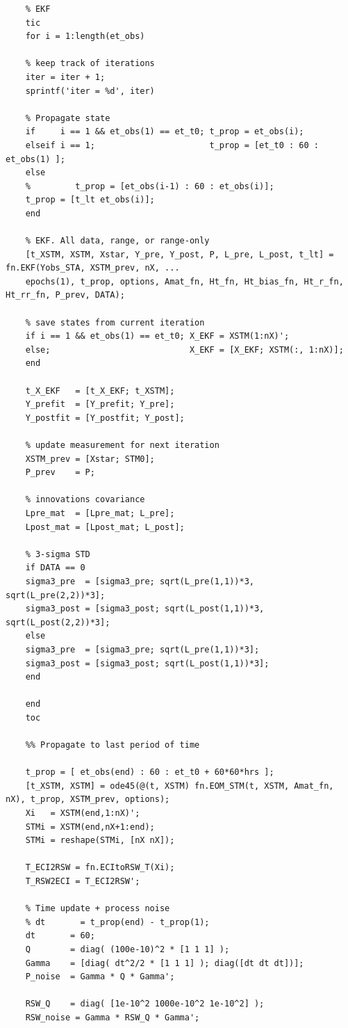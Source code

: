 \documentclass[conf]{new-aiaa}
\begin{document}
\begin{lstlisting}
	% EKF 
	tic
	for i = 1:length(et_obs) 
	
	% keep track of iterations 
	iter = iter + 1; 
	sprintf('iter = %d', iter)
	
	% Propagate state 
	if     i == 1 && et_obs(1) == et_t0; t_prop = et_obs(i); 
	elseif i == 1;                       t_prop = [et_t0 : 60 : et_obs(1) ]; 
	else                                
	%         t_prop = [et_obs(i-1) : 60 : et_obs(i)]; 
	t_prop = [t_lt et_obs(i)]; 
	end
	
	% EKF. All data, range, or range-only 
	[t_XSTM, XSTM, Xstar, Y_pre, Y_post, P, L_pre, L_post, t_lt] = fn.EKF(Yobs_STA, XSTM_prev, nX, ... 
	epochs(1), t_prop, options, Amat_fn, Ht_fn, Ht_bias_fn, Ht_r_fn, Ht_rr_fn, P_prev, DATA); 
	
	% save states from current iteration 
	if i == 1 && et_obs(1) == et_t0; X_EKF = XSTM(1:nX)'; 
	else;                            X_EKF = [X_EKF; XSTM(:, 1:nX)]; 
	end 
	
	t_X_EKF   = [t_X_EKF; t_XSTM]; 
	Y_prefit  = [Y_prefit; Y_pre]; 
	Y_postfit = [Y_postfit; Y_post]; 
	
	% update measurement for next iteration 
	XSTM_prev = [Xstar; STM0]; 
	P_prev    = P;
	
	% innovations covariance 
	Lpre_mat  = [Lpre_mat; L_pre]; 
	Lpost_mat = [Lpost_mat; L_post]; 
	
	% 3-sigma STD 
	if DATA == 0
	sigma3_pre  = [sigma3_pre; sqrt(L_pre(1,1))*3, sqrt(L_pre(2,2))*3];  
	sigma3_post = [sigma3_post; sqrt(L_post(1,1))*3, sqrt(L_post(2,2))*3];  
	else  
	sigma3_pre  = [sigma3_pre; sqrt(L_pre(1,1))*3];  
	sigma3_post = [sigma3_post; sqrt(L_post(1,1))*3];  
	end
	
	end 
	toc
	
	%% Propagate to last period of time 
	
	t_prop = [ et_obs(end) : 60 : et_t0 + 60*60*hrs ]; 
	[t_XSTM, XSTM] = ode45(@(t, XSTM) fn.EOM_STM(t, XSTM, Amat_fn, nX), t_prop, XSTM_prev, options); 
	Xi   = XSTM(end,1:nX)'; 
	STMi = XSTM(end,nX+1:end); 
	STMi = reshape(STMi, [nX nX]); 
	
	T_ECI2RSW = fn.ECItoRSW_T(Xi); 
	T_RSW2ECI = T_ECI2RSW';
	
	% Time update + process noise 
	% dt       = t_prop(end) - t_prop(1); 
	dt       = 60; 
	Q        = diag( (100e-10)^2 * [1 1 1] ); 
	Gamma    = [diag( dt^2/2 * [1 1 1] ); diag([dt dt dt])]; 
	P_noise  = Gamma * Q * Gamma'; 
	
	RSW_Q    = diag( [1e-10^2 1000e-10^2 1e-10^2] ); 
	RSW_noise = Gamma * RSW_Q * Gamma'; 
	

\end{lstlisting}
\end{document}
